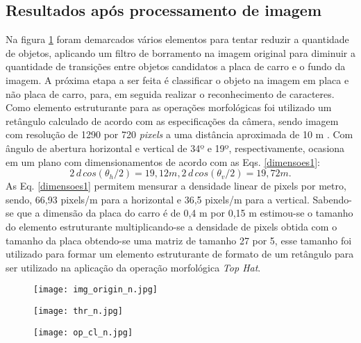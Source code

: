 \subsection{Resultados após processamento de imagem}


Na figura \ref{fig1:demarcada} foram demarcados vários elementos para tentar reduzir a quantidade de objetos, aplicando um filtro de borramento na imagem original para diminuir a quantidade de transições entre objetos candidatos a placa de carro e o fundo da imagem. A próxima etapa a ser feita é classificar o objeto na imagem em placa e não placa de carro, para, em seguida realizar o reconhecimento de caracteres.
Como elemento estruturante para as operações morfológicas foi utilizado um retângulo calculado de acordo com as especificações da câmera, sendo imagem com resolução de 1290 por 720 \emph{pixels} a uma distância aproximada de 10 m . Com ângulo de abertura horizontal e vertical de 34º e 19º, respectivamente, ocasiona em um plano com dimensionamentos de acordo com as Eqs. \ref{dimensoes1}:
\begin{equation}
    2\,d\,cos(\theta_{h} /2) = 19,12 m, 
    2\,d\,cos(\theta_{v} /2) = 19,72 m.
    \label{dimensoes1}
\end{equation}
As Eq. \ref{dimensoes1} permitem mensurar a densidade linear de pixels por metro, sendo, 66,93 pixels/m para a horizontal e 36,5 pixels/m para a vertical.
Sabendo-se que a dimensão da placa do carro é de 0,4 m por 0,15 m estimou-se o tamanho do elemento estruturante multiplicando-se a densidade de pixels obtida com o tamanho da placa obtendo-se uma matriz de tamanho 27 por 5, esse tamanho foi utilizado para formar um elemento estruturante de formato de um retângulo para ser utilizado na aplicação da operação morfológica \emph{Top Hat}. 

\begin{figure*}[t!]
     \centering
     
     \begin{subfigure}{0.7\textwidth}
         \texttt{[image: img\_origin\_n.jpg]}
         \caption{}
         \label{fig1:demarcada}
     \end{subfigure}

     \begin{subfigure}{0.7\textwidth}
         \texttt{[image: thr\_n.jpg]}
          \caption{}
         \label{fig2:thresh}
     \end{subfigure}

     \begin{subfigure}{0.7\textwidth}
         \texttt{[image: op\_cl\_n.jpg]}
          \caption{}
         \label{fig3:op_cl}
         
     \end{subfigure}
  \caption{\ref{fig1:demarcada} mostra marcação de locais possíveis onde pode haver uma placa de carro, \ref{fig2:thresh} corresponde a \emph{Top hat} mais binarização de Otsu e \ref{fig3:op_cl} mostra operações de abertura e fechamento.}
    \label{fig:three graphs}
\end{figure*}
